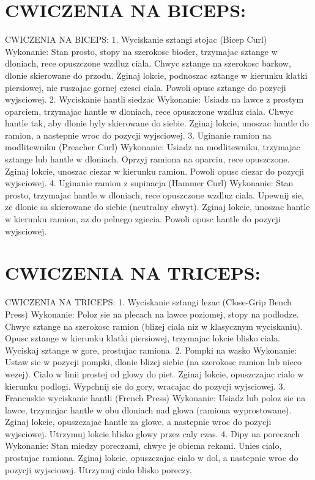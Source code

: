 \documentclass{beamer}
\begin{document}
\section{CWICZENIA NA BICEPS:}
\begin{frame}{CWICZENIA NA BICEPS:}
1. Wyciskanie sztangi stojac (Bicep Curl)
Wykonanie:
Stan prosto, stopy na szerokosc bioder, trzymajac sztange w dloniach, rece opuszczone wzdluz ciala.
Chwyc sztange na szerokosc barkow, dlonie skierowane do przodu.
Zginaj lokcie, podnoszac sztange w kierunku klatki piersiowej, nie ruszajac gornej czesci ciala.
Powoli opusc sztange do pozycji wyjsciowej.
2. Wyciskanie hantli siedzac
Wykonanie:
Usiadz na lawce z prostym oparciem, trzymajac hantle w dloniach, rece opuszczone wzdluz ciala.
Chwyc hantle tak, aby dlonie byly skierowane do siebie.
Zginaj lokcie, unoszac hantle do ramion, a nastepnie wroc do pozycji wyjsciowej.
3. Uginanie ramion na modlitewniku (Preacher Curl)
Wykonanie:
Usiadz na modlitewniku, trzymajac sztange lub hantle w dloniach.
Oprzyj ramiona na oparciu, rece opuszczone.
Zginaj lokcie, unoszac ciezar w kierunku ramion.
Powoli opusc ciezar do pozycji wyjsciowej.
4. Uginanie ramion z supinacja (Hammer Curl)
Wykonanie:
Stan prosto, trzymajac hantle w dloniach, rece opuszczone wzdluz ciala.
Upewnij sie, ze dlonie sa skierowane do siebie (neutralny chwyt).
Zginaj lokcie, unoszac hantle w kierunku ramion, az do pelnego zgiecia.
Powoli opusc hantle do pozycji wyjsciowej.
\end{frame}
\section{CWICZENIA NA TRICEPS:}
\begin{frame}{CWICZENIA NA TRICEPS:}
1. Wyciskanie sztangi lezac (Close-Grip Bench Press)
Wykonanie:
Poloz sie na plecach na lawce poziomej, stopy na podlodze.
Chwyc sztange na szerokosc ramion (blizej ciala niz w klasycznym wyciskaniu).
Opusc sztange w kierunku klatki piersiowej, trzymajac lokcie blisko ciala.
Wyciskaj sztange w gore, prostujac ramiona.
2. Pompki na wasko
Wykonanie:
Ustaw sie w pozycji pompki, dlonie blizej siebie (na szerokosc ramion lub nieco wezej).
Cialo w linii prostej od glowy do piet.
Zginaj lokcie, opuszczajac cialo w kierunku podlogi.
Wypchnij sie do gory, wracajac do pozycji wyjsciowej.
3. Francuskie wyciskanie hantli (French Press)
Wykonanie:
Usiadz lub poloz sie na lawce, trzymajac hantle w obu dloniach nad glowa (ramiona wyprostowane).
Zginaj lokcie, opuszczajac hantle za glowe, a nastepnie wroc do pozycji wyjsciowej.
Utrzymuj lokcie blisko glowy przez caly czas.
4. Dipy na poreczach
Wykonanie:
Stan miedzy poreczami, chwyc je obiema rekami.
Unies cialo, prostujac ramiona.
Zginaj lokcie, opuszczajac cialo w dol, a nastepnie wroc do pozycji wyjsciowej.
Utrzymuj cialo blisko poreczy.
\end{frame}
\end{document}
